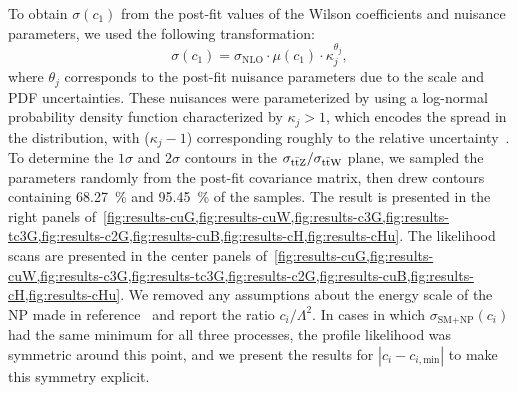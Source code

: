 \begin{landscape}
  \begin{table}
    
  \end{table}
  \begin{table}
    
  \end{table}
  \begin{table}
    
  \end{table}
  \begin{table}
    
  \end{table}
\end{landscape}

\begin{table}
  
\end{table}

To obtain $\sigma(c_1)$ from the post-fit values of the Wilson coefficients and
nuisance parameters, we used the following transformation:
\begin{equation}
  \sigma(c_1) = \sigma_\mathrm{NLO} \cdot \mu(c_1) \cdot \kappa_j^{\theta_j},
\end{equation}
where $\theta_j$ corresponds to the post-fit nuisance parameters due to the
scale and PDF uncertainties. These nuisances were parameterized by using a
log-normal probability density function characterized by $\kappa_j > 1$, which
encodes the spread in the distribution, with ($\kappa_j - 1$) corresponding
roughly to the relative uncertainty~\cite{Cousins2010}. To determine the
$1\sigma$ and $2\sigma$ contours in the $\sigma_{\text{t}\bar{\text{t}}\text{Z}}/\sigma_{\text{t}\bar{\text{t}}\text{W}}$ plane, we
sampled the parameters randomly from the post-fit covariance matrix, then drew
contours containing \SI{68.27}{\percent} and \SI{95.45}{\percent} of the
samples. The result is presented in the right panels
of~\cref{fig:results-cuG,fig:results-cuW,fig:results-c3G,fig:results-tc3G,fig:results-c2G,fig:results-cuB,fig:results-cH,fig:results-cHu}.
The likelihood scans are presented in the center panels
of~\cref{fig:results-cuG,fig:results-cuW,fig:results-c3G,fig:results-tc3G,fig:results-c2G,fig:results-cuB,fig:results-cH,fig:results-cHu}.
We removed any assumptions about the energy scale of the NP made in
reference~\cite{Alloul2014} and report the ratio $c_i/\Lambda^2$. In cases in
which $\sigma_{\text{SM+NP}}(c_i)$ had the same minimum for all three processes,
the profile likelihood was symmetric around this point, and we present the
results for $|c_i - c_{i,\text{min}}|$ to make this symmetry explicit.

